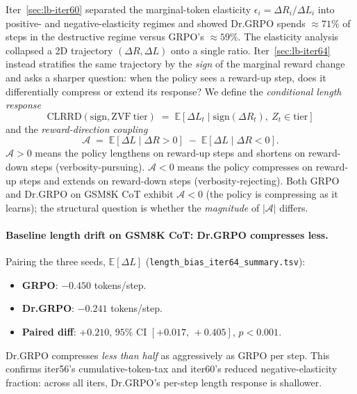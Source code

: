 \documentclass{article}
\begin{document}
Iter~\ref{sec:lb-iter60} separated the marginal-token elasticity
$\epsilon_i = \Delta R_i / \Delta L_i$ into positive- and negative-elasticity
regimes and showed Dr.GRPO spends $\approx 71\%$ of steps in the
destructive regime versus GRPO's $\approx 59\%$. The elasticity analysis
collapsed a 2D trajectory $(\Delta R, \Delta L)$ onto a single ratio.
Iter~\ref{sec:lb-iter64} instead stratifies the same trajectory by the
\emph{sign} of the marginal reward change and asks a sharper question:
when the policy sees a reward-up step, does it differentially compress
or extend its response? We define the \emph{conditional length response}
\begin{equation}\label{eq:lb64-clrrd}
\mathrm{CLRRD}(\mathrm{sign}, \mathrm{ZVF\ tier}) \;=\; \mathbb{E}\!\left[\Delta L_t \mid \mathrm{sign}(\Delta R_t),\ Z_t \in \mathrm{tier}\right]
\end{equation}
and the \emph{reward-direction coupling}
\begin{equation}\label{eq:lb64-alignment}
\mathcal{A} \;=\; \mathbb{E}[\Delta L \mid \Delta R > 0] \;-\; \mathbb{E}[\Delta L \mid \Delta R < 0].
\end{equation}
$\mathcal{A} > 0$ means the policy lengthens on reward-up steps and
shortens on reward-down steps (verbosity-pursuing).
$\mathcal{A} < 0$ means the policy compresses on reward-up steps and
extends on reward-down steps (verbosity-rejecting). Both GRPO and
Dr.GRPO on GSM8K CoT exhibit $\mathcal{A} < 0$ (the policy is
compressing as it learns); the structural question is whether the
\emph{magnitude} of $|\mathcal{A}|$ differs.

\paragraph{Baseline length drift on GSM8K CoT: Dr.GRPO compresses less.}
Pairing the three seeds, $\mathbb{E}[\Delta L]$
(\texttt{length\_bias\_iter64\_summary.tsv}):
\begin{itemize}
\item \textbf{GRPO}: $-0.450$ tokens/step.
\item \textbf{Dr.GRPO}: $-0.241$ tokens/step.
\item \textbf{Paired diff}: $+0.210$, $95\%$ CI $[+0.017,\, +0.405]$,
      $p < 0.001$.
\end{itemize}
Dr.GRPO compresses \emph{less than half} as aggressively as GRPO per
step. This confirms iter56's cumulative-token-tax and iter60's reduced
negative-elasticity fraction: across all iters, Dr.GRPO's per-step
length response is shallower.
\end{document}
